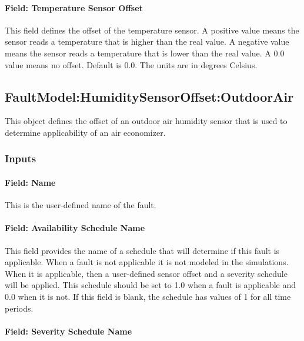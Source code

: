 \paragraph{Field: Temperature Sensor Offset}\label{field-temperature-sensor-offset}

This field defines the offset of the temperature sensor. A positive value means the sensor reads a temperature that is higher than the real value. A negative value means the sensor reads a temperature that is lower than the real value. A 0.0 value means no offset. Default is 0.0. The units are in degrees Celsius.

\subsection{FaultModel:HumiditySensorOffset:OutdoorAir}\label{faultmodelhumiditysensoroffsetoutdoorair}

This object defines the offset of an outdoor air humidity sensor that is used to determine applicability of an air economizer.

\subsubsection{Inputs}\label{inputs-1-026}

\paragraph{Field: Name}\label{field-name-1-025}

This is the user-defined name of the fault.

\paragraph{Field: Availability Schedule Name}\label{field-availability-schedule-name-1-009}

This field provides the name of a schedule that will determine if this fault is applicable. When a fault is not applicable it is not modeled in the simulations. When it is applicable, then a user-defined sensor offset and a severity schedule will be applied. This schedule should be set to 1.0 when a fault is applicable and 0.0 when it is not. If this field is blank, the schedule has values of 1 for all time periods.

\paragraph{Field: Severity Schedule Name}\label{field-severity-schedule-name-1}

